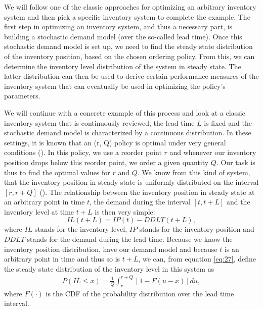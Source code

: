 \documentclass{article}
\begin{document}
\begin{flushleft}
    We will follow one of the classic approaches for optimizing an arbitrary inventory system and then pick a specific inventory system to complete the example.
    The first step in optimizing an inventory system, and thus a necessary part, is building a stochastic demand model (over the so-called lead time).
    Once this stochastic demand model is set up, we need to find the steady state distribution of the inventory position, based on the chosen ordering policy.
    From this, we can determine the inventory level distribution of the system in steady state.
    The latter distribution can then be used to derive certain performance measures of the inventory system that can eventually be used in optimizing the policy's parameters.
\end{flushleft}
\begin{flushleft}
    We will continue with a concrete example of this process and look at a classic inventory system that is continuously reviewed, the lead time $L$ is fixed and the stochastic demand model is characterized by a continuous distribution.
    In these settings, it is known that an (r, Q) policy is optimal under very general conditions (\cite{ArrowKarlinScarf}). In this policy, we use a reorder point $r$ and whenever our inventory position drops below this reorder point, we order a given quantity $Q$.
    Our task is thus to find the optimal values for $r$ and $Q$.
    We know from this kind of system, that the inventory position in steady state is uniformly distributed on the interval $[r, r+Q]$ (\cite{RePEc:spr:isorms:978-3-319-15729-0}).
    The relationship between the inventory position in steady state at an arbitrary point in time $t$, the demand during the interval $[t, t+L]$ and the inventory level at time $t+L$ is then very simple:
    \begin{equation} \label{eq:27}
        IL(t+L) = IP(t) - DDLT(t+L),
    \end{equation}
    where $IL$ stands for the inventory level, $IP$ stands for the inventory position and $DDLT$ stands for the demand during the lead time.
    Because we know the inventory position distribution, have our demand model and because $t$ is an arbitrary point in time and thus so is $t+L$, we can, from equation \ref{eq:27}, define the steady state distribution of the inventory level in this system as
    \begin{align*}
        P(IL \le x) = \frac{1}{Q}\int_r^{r+Q}\left[1-F(u-x)\right] du,
    \end{align*}
    where $F(\cdot)$ is the CDF of the probability distribution over the lead time interval.
\end{flushleft}
\end{document}
